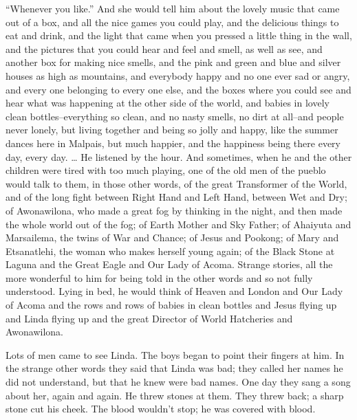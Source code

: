 \documentclass[12pt]{report}
\begin{document}
``Whenever you like.'' And she would tell him about the lovely music
that came out of a box, and all the nice games you could play, and the
delicious things to eat and drink, and the light that came when you
pressed a little thing in the wall, and the pictures that you could hear
and feel and smell, as well as see, and another box for making nice
smells, and the pink and green and blue and silver houses as high as
mountains, and everybody happy and no one ever sad or angry, and every
one belonging to every one else, and the boxes where you could see and
hear what was happening at the other side of the world, and babies in
lovely clean bottles--everything so clean, and no nasty smells, no dirt
at all--and people never lonely, but living together and being so jolly
and happy, like the summer dances here in Malpais, but much happier, and
the happiness being there every day, every day. \ldots{} He listened by
the hour. And sometimes, when he and the other children were tired with
too much playing, one of the old men of the pueblo would talk to them,
in those other words, of the great Transformer of the World, and of the
long fight between Right Hand and Left Hand, between Wet and Dry; of
Awonawilona, who made a great fog by thinking in the night, and then
made the whole world out of the fog; of Earth Mother and Sky Father; of
Ahaiyuta and Marsailema, the twins of War and Chance; of Jesus and
Pookong; of Mary and Etsanatlehi, the woman who makes herself young
again; of the Black Stone at Laguna and the Great Eagle and Our Lady of
Acoma. Strange stories, all the more wonderful to him for being told in
the other words and so not fully understood. Lying in bed, he would
think of Heaven and London and Our Lady of Acoma and the rows and rows
of babies in clean bottles and Jesus flying up and Linda flying up and
the great Director of World Hatcheries and Awonawilona.

Lots of men came to see Linda. The boys began to point their fingers at
him. In the strange other words they said that Linda was bad; they
called her names he did not understand, but that he knew were bad names.
One day they sang a song about her, again and again. He threw stones at
them. They threw back; a sharp stone cut his cheek. The blood wouldn't
stop; he was covered with blood.
\end{document}
